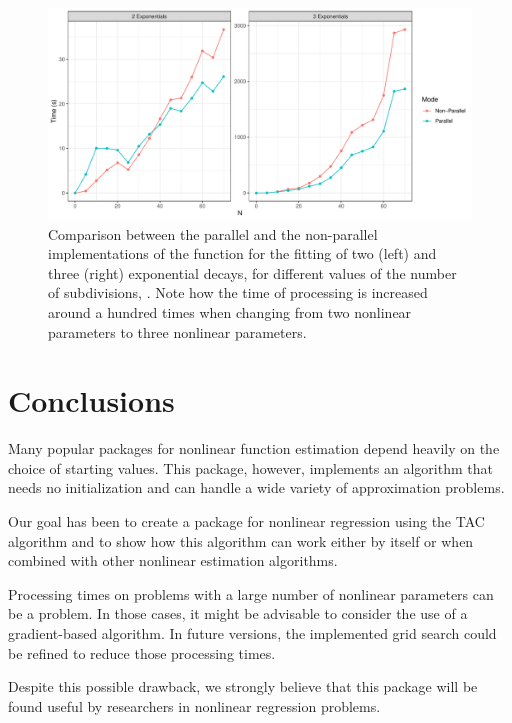 \begin{figure}[htb]
    \centering
    \includegraphics[width=0.9\linewidth]{benchmark23}
    \caption{Comparison between the parallel and the non-parallel implementations of the  function for the fitting of two (left) and three (right) exponential decays, for different values of the number of subdivisions, . Note how the time of processing is increased around a hundred times when changing from two nonlinear parameters to three nonlinear parameters.}
    \label{fig:bench23}
\end{figure}

\section{Conclusions}
Many popular packages for nonlinear function estimation depend heavily on the choice of starting values. This package, however, implements an algorithm that needs no initialization and can handle a wide variety of approximation problems.

Our goal has been to create a package for nonlinear regression using the TAC algorithm and to show how this algorithm can work either by itself or when combined with other nonlinear estimation algorithms. 

Processing times on problems with a large number of nonlinear parameters can be a problem. In those cases, it might be advisable to consider the use of a gradient-based algorithm. In future versions, the implemented grid search could be refined to reduce those processing times.

Despite this possible drawback, we strongly believe that this package will be found useful by researchers in nonlinear regression problems.
